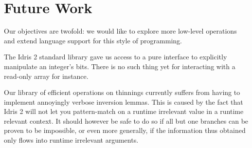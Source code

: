 \documentclass{article}
\newcommand{\idris}{Idris 2}
\begin{document}

\section{Future Work}

Our objectives are twofold: we would like to explore more low-level operations and
extend language support for this style of programming.

The \idris{} standard library gave us access to a pure interface to explicitly
manipulate an integer's bits. There is no such thing yet for interacting with a
read-only array for instance.

Our library of efficient operations on thinnings currently suffers from having to
implement annoyingly verbose inversion lemmas. This is caused by the fact that
\idris{} will not let you pattern-match on a runtime irrelevant value in a runtime
relevant context. It should however be safe to do so if all but one branches can
be proven to be impossible, or even more generally, if the information thus obtained
only flows into runtime irrelevant arguments.


\end{document}
